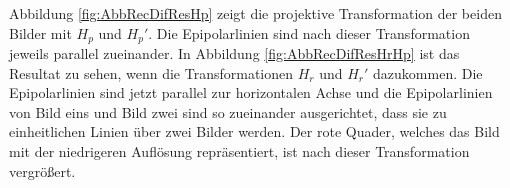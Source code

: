 
Abbildung \ref{fig:AbbRecDifResHp} zeigt die projektive Transformation der beiden Bilder mit $H_p$ und $H_p'$. Die Epipolarlinien sind nach dieser Transformation jeweils parallel zueinander. In Abbildung \ref{fig:AbbRecDifResHrHp} ist das Resultat zu sehen, wenn die Transformationen $H_r$ und $H_r'$ dazukommen. Die Epipolarlinien sind jetzt parallel zur horizontalen Achse und die Epipolarlinien von Bild eins und Bild zwei sind so zueinander ausgerichtet, dass sie zu einheitlichen Linien über zwei Bilder werden. Der rote Quader, welches das Bild mit der niedrigeren Auflösung repräsentiert, ist nach dieser Transformation vergrößert. 


